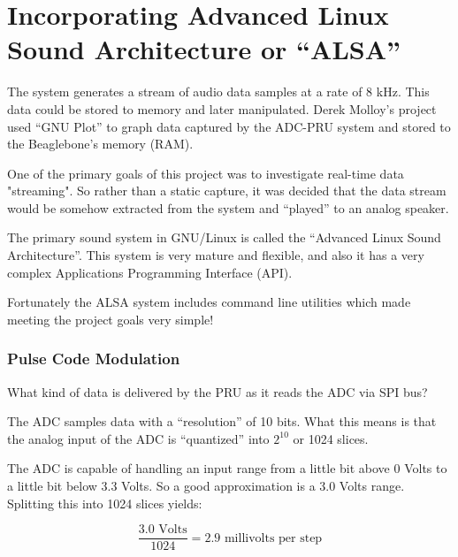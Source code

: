 %
%
%

\chapter{Incorporating Advanced Linux Sound Architecture or ``ALSA''}

The system generates a stream of audio data samples at a rate of 8 kHz.  This data could be stored to memory and later manipulated.  Derek Molloy's project used ``GNU Plot'' to graph data captured by the ADC-PRU system and stored to the Beaglebone's memory (RAM).

One of the primary goals of this project was to investigate real-time data "streaming".  So rather than a static capture, it was decided that the data stream would be somehow extracted from the system and ``played'' to an analog speaker.

The primary sound system in GNU/Linux is called the ``Advanced Linux Sound Architecture''.  This system is very mature and flexible, and also it has a very complex Applications Programming Interface (API).

Fortunately the ALSA system includes command line utilities which made meeting the project goals very simple!

\subsection{Pulse Code Modulation}

What kind of data is delivered by the PRU as it reads the ADC via SPI bus?

The ADC samples data with a ``resolution'' of 10 bits.  What this means is that the analog input of the ADC is ``quantized'' into $2^{10}$ or 1024 slices.

The ADC is capable of handling an input range from a little bit above 0 Volts to a little bit below 3.3 Volts.  So a good approximation is a 3.0 Volts range.  Splitting this into 1024 slices yields:

\[ \frac{\text{3.0 Volts}}{1024}  = \text{2.9 millivolts per step} \]
